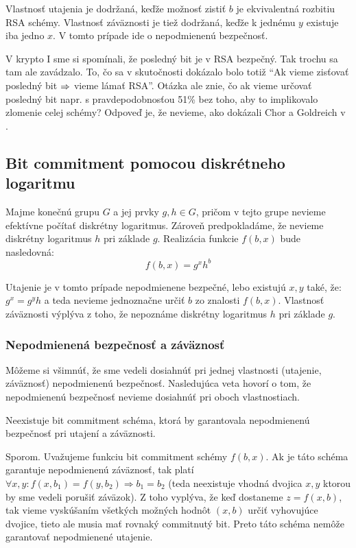 Vlastnosť utajenia je dodržaná, keďže možnosť zistiť $b$
je ekvivalentná rozbitiu RSA schémy.
Vlastnosť záväznosti je tiež dodržaná,
keďže k jednému $y$ existuje iba jedno $x$.
V tomto prípade ide o nepodmienenú bezpečnosť.

\begin{poznamka}
    V krypto I sme si spomínali, že posledný bit je v RSA bezpečný.
    Tak trochu sa tam ale zavádzalo. To, čo sa v skutočnosti dokázalo
    bolo totiž ``Ak vieme zisťovať posledný bit $\Rightarrow$ vieme lámať
    RSA''. Otázka ale znie, čo ak vieme určovať posledný bit napr. s
    pravdepodobnosťou 51\% bez toho, aby to implikovalo zlomenie celej
    schémy? Odpoveď je, že nevieme, ako dokázali Chor a Goldreich v 
    \cite{rsa-lsb}.
\end{poznamka}

\subsection{Bit commitment pomocou diskrétneho logaritmu}
Majme konečnú grupu $G$ a jej prvky $g, h \in G$,
pričom v tejto grupe nevieme efektívne počítať diskrétny logaritmus.
Zároveň predpokladáme, že
nevieme diskrétny logaritmus $h$ pri základe $g$.
Realizácia funkcie $f(b,x)$ bude nasledovná: 
\begin{equation*}
    f(b,x) = g^x h^b
\end{equation*}

Utajenie je v tomto prípade nepodmienene bezpečné,
lebo existujú $x, y$ také, že: $g^x = g^y h$ 
a teda nevieme jednoznačne určiť $b$ zo znalosti $f(b,x)$.
Vlastnosť záväznosti výplýva z toho, že nepoznáme
diskrétny logaritmus $h$ pri základe $g$.


\subsubsection{Nepodmienená bezpečnosť a záväznosť}
Môžeme si všimnúť, že sme vedeli dosiahnúť pri jednej vlastnosti 
(utajenie, záväznosť) nepodmienenú bezpečnosť.
Nasledujúca veta hovorí o tom, že nepodmienenú bezpečnosť 
nevieme dosiahnúť pri oboch vlastnostiach.

\begin{veta}
Neexistuje bit commitment schéma, ktorá by garantovala 
nepodmienenú bezpečnosť pri utajení a záväznosti.
\end{veta}

\begin{dokaz}
Sporom. 
Uvažujeme funkciu bit commitment schémy $f(b,x)$.
Ak je táto schéma garantuje nepodmienenú záväznosť, tak
platí $\forall x, y\colon f(x,b_1) = f(y,b_2) \Rightarrow b_1 = b_2$
(teda neexistuje vhodná dvojica
$x, y$ ktorou by sme vedeli porušiť záväzok).
Z toho vyplýva, že keď dostaneme $z = f(x,b)$, tak vieme 
vyskúšaním všetkých možných hodnôt $(x,b)$ určiť vyhovujúce dvojice,
tieto ale musia mať rovnaký commitnutý bit.
Preto táto schéma nemôže garantovať nepodmienené utajenie.
\end{dokaz}


